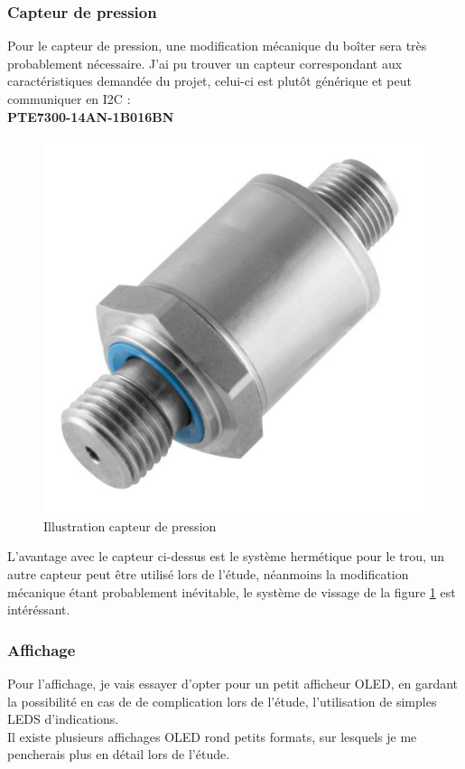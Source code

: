 {\clearpage

\subsubsection{Capteur de pression}
{
Pour le capteur de pression, une modification mécanique du boîter sera très probablement nécessaire. J'ai pu trouver un capteur correspondant aux caractéristiques demandée du projet, celui-ci est plutôt générique et peut communiquer en I2C : \\
\textbf{PTE7300-14AN-1B016BN}

\begin{figure}[h] 
    \centering
    \includegraphics[width=.4\textwidth]{Figures/Capteur-pression}
    \caption{Illustration capteur de pression}
    \label{fig:CaptPress}
\end{figure}

L'avantage avec le capteur ci-dessus est le système hermétique pour le trou, un autre capteur peut être utilisé lors de l'étude, néanmoins la modification mécanique étant probablement inévitable, le système de vissage de la figure \ref{fig:CaptPress} est intéréssant.

}

\subsubsection{Affichage}
{
    Pour l'affichage, je vais essayer d'opter pour un petit afficheur OLED, en gardant la possibilité en cas de de complication lors de l'étude, l'utilisation de simples LEDS d'indications.
    \\
    Il existe plusieurs affichages OLED rond petits formats, sur lesquels je me pencherais plus en détail lors de l'étude.
    


}}
